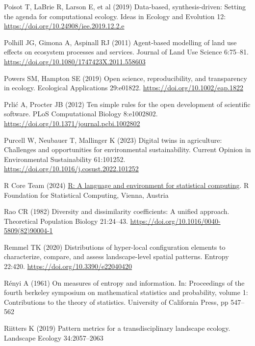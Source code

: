 \documentclass[
  10pt,
  a4paperpaper,
]{article}
\newlength{\cslhangindent}
\newenvironment{CSLReferences}[2] %
 {\begin{list}{}{%
  \setlength{\itemindent}{0pt}
  \setlength{\leftmargin}{0pt}
  \setlength{\parsep}{0pt}
  \ifodd #1
   \setlength{\leftmargin}{\cslhangindent}
   \setlength{\itemindent}{-1\cslhangindent}
  \fi
  \setlength{\itemsep}{#2\baselineskip}}}
 {\end{list}}
\begin{document}
\begin{CSLReferences}{1}{1}
Poisot T, LaBrie R, Larson E, et al (2019) Data-based, synthesis-driven:
Setting the agenda for computational ecology. Ideas in Ecology and
Evolution 12: \url{https://doi.org/10.24908/iee.2019.12.2.e}

Polhill JG, Gimona A, Aspinall RJ (2011) Agent-based modelling of land
use effects on ecosystem processes and services. Journal of Land Use
Science 6:75--81. \url{https://doi.org/10.1080/1747423X.2011.558603}

Powers SM, Hampton SE (2019) Open science, reproducibility, and
transparency in ecology. Ecological Applications 29:e01822.
\url{https://doi.org/10.1002/eap.1822}

Prlić A, Procter JB (2012) Ten simple rules for the open development of
scientific software. PLoS Computational Biology 8:e1002802.
\url{https://doi.org/10.1371/journal.pcbi.1002802}

Purcell W, Neubauer T, Mallinger K (2023) Digital twins in agriculture:
Challenges and opportunities for environmental sustainability. Current
Opinion in Environmental Sustainability 61:101252.
\url{https://doi.org/10.1016/j.cosust.2022.101252}

R Core Team (2024) \href{https://www.R-project.org/}{R: A language and
environment for statistical computing}. R Foundation for Statistical
Computing, Vienna, Austria

Rao CR (1982) Diversity and dissimilarity coefficients: A unified
approach. Theoretical Population Biology 21:24--43.
\url{https://doi.org/10.1016/0040-5809(82)90004-1}

Remmel TK (2020) Distributions of hyper-local configuration elements to
characterize, compare, and assess landscape-level spatial patterns.
Entropy 22:420. \url{https://doi.org/10.3390/e22040420}

Rényi A (1961) On measures of entropy and information. In: Proceedings
of the fourth berkeley symposium on mathematical statistics and
probability, volume 1: Contributions to the theory of statistics.
University of California Press, pp 547--562

Riitters K (2019) Pattern metrics for a transdisciplinary landscape
ecology. Landscape Ecology 34:2057--2063


\end{CSLReferences}
\end{document}
